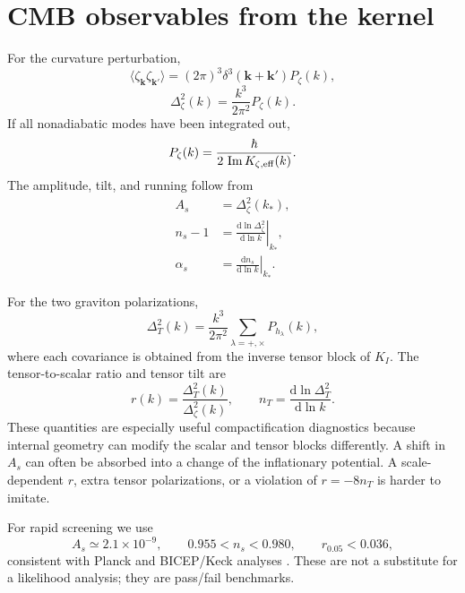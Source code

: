 \documentclass[aps,prd,twocolumn,superscriptaddress,nofootinbib,longbibliography]{revtex4-2}
\newcommand{\dd}{\mathrm d}
\begin{document}
\section{CMB observables from the kernel}
\label{sec:observables}

For the curvature perturbation,
\begin{equation}
\langle\zeta_{\bm k}\zeta_{\bm k'}\rangle
=(2\pi)^3\delta^3(\bm k+\bm k')P_\zeta(k),
\end{equation}
\begin{equation}
\Delta_\zeta^2(k)=\frac{k^3}{2\pi^2}P_\zeta(k).
\end{equation}
If all nonadiabatic modes have been integrated out,
\begin{equation}
P_\zeta(k)=\frac{\hbar}{2\,\operatorname{Im}K_{\zeta,\rm eff}(k)}.
\label{eq:pzeta}
\end{equation}
The amplitude, tilt, and running follow from
\begin{align}
A_s&=\Delta_\zeta^2(k_*),\\
n_s-1&=\left.\frac{\dd\ln\Delta_\zeta^2}{\dd\ln k}\right|_{k_*},\\
\alpha_s&=\left.\frac{\dd n_s}{\dd\ln k}\right|_{k_*}.
\end{align}

For the two graviton polarizations,
\begin{equation}
\Delta_T^2(k)=\frac{k^3}{2\pi^2}\sum_{\lambda=+,\times}P_{h_\lambda}(k),
\end{equation}
where each covariance is obtained from the inverse tensor block of $K_I$. The tensor-to-scalar ratio and tensor tilt are
\begin{equation}
r(k)=\frac{\Delta_T^2(k)}{\Delta_\zeta^2(k)},\qquad
n_T=\frac{\dd\ln\Delta_T^2}{\dd\ln k}.
\end{equation}
These quantities are especially useful compactification diagnostics because internal geometry can modify the scalar and tensor blocks differently. A shift in $A_s$ can often be absorbed into a change of the inflationary potential. A scale-dependent $r$, extra tensor polarizations, or a violation of $r=-8n_T$ is harder to imitate.

For rapid screening we use
\begin{equation}
A_s\simeq2.1\times10^{-9},\qquad
0.955<n_s<0.980,\qquad r_{0.05}<0.036,
\label{eq:screen}
\end{equation}
consistent with Planck and BICEP/Keck analyses \cite{PlanckInflation2020,BICEPKeck2021,BICEPKeckReview2024}. These are not a substitute for a likelihood analysis; they are pass/fail benchmarks.
\end{document}
